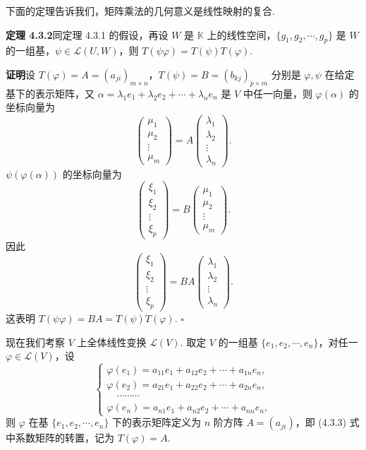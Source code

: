 \documentclass[UTF8,12pt,a4paper,fontset=fandol]{ctexart}
\begin{document}
下面的定理告诉我们，矩阵乘法的几何意义是线性映射的复合.

\noindent\textbf{定理 4.3.2}\quad 同定理 4.3.1 的假设，再设 $W$ 是 $\mathbb{K}$ 上的线性空间，$\{g_1,g_2,\cdots,g_p\}$ 是 $W$ 的一组基，$\psi\in\mathcal{L}(U,W)$，则 $T(\psi\varphi)=T(\psi)T(\varphi)$.

\noindent\textbf{证明}\quad 设 $T(\varphi)=A=(a_{ji})_{m\times n}$，$T(\psi)=B=(b_{kj})_{p\times m}$ 分别是 $\varphi,\psi$ 在给定基下的表示矩阵，又 $\alpha=\lambda_1e_1+\lambda_2e_2+\cdots+\lambda_ne_n$ 是 $V$ 中任一向量，则 $\varphi(\alpha)$ 的坐标向量为
\[
\left(\begin{array}{c}
\mu_1\\
\mu_2\\
\vdots\\
\mu_m
\end{array}\right)
=A
\left(\begin{array}{c}
\lambda_1\\
\lambda_2\\
\vdots\\
\lambda_n
\end{array}\right).
\]
$\psi(\varphi(\alpha))$ 的坐标向量为
\[
\left(\begin{array}{c}
\xi_1\\
\xi_2\\
\vdots\\
\xi_p
\end{array}\right)
=B
\left(\begin{array}{c}
\mu_1\\
\mu_2\\
\vdots\\
\mu_m
\end{array}\right).
\]
因此
\[
\left(\begin{array}{c}
\xi_1\\
\xi_2\\
\vdots\\
\xi_p
\end{array}\right)
=BA
\left(\begin{array}{c}
\lambda_1\\
\lambda_2\\
\vdots\\
\lambda_n
\end{array}\right).
\]
这表明 $T(\psi\varphi)=BA=T(\psi)T(\varphi)$. $\square$

现在我们考察 $V$ 上全体线性变换 $\mathcal{L}(V)$. 取定 $V$ 的一组基 $\{e_1,e_2,\cdots,e_n\}$，对任一 $\varphi\in\mathcal{L}(V)$，设
\begin{equation}
\left\{
\begin{array}{l}
\varphi(e_1)=a_{11}e_1+a_{12}e_2+\cdots+a_{1n}e_n,\\
\varphi(e_2)=a_{21}e_1+a_{22}e_2+\cdots+a_{2n}e_n,\\
\quad\cdots\cdots\cdots\\
\varphi(e_n)=a_{n1}e_1+a_{n2}e_2+\cdots+a_{nn}e_n,
\end{array}\right.
\tag{4.3.3}
\end{equation}
则 $\varphi$ 在基 $\{e_1,e_2,\cdots,e_n\}$ 下的表示矩阵定义为 $n$ 阶方阵 $A=(a_{ji})$，即 (4.3.3) 式中系数矩阵的转置，记为 $T(\varphi)=A$.
\end{document}
